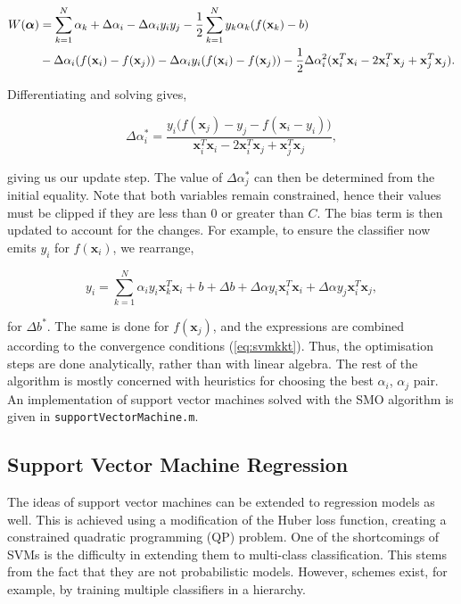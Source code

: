 \documentclass[11pt]{amsart}
\begin{document}
\begin{align}
W(\boldsymbol\alpha) &= \sum_{k=1}^N\alpha_k + \Delta\alpha_i -\Delta\alpha_iy_iy_j - \frac{1}{2}\sum_{k=1}^Ny_k\alpha_k(f(\mathbf{x}_k) - b) \notag \\ 
&- \Delta\alpha_i(f(\mathbf{x}_i) - f(\mathbf{x}_j)) - \Delta\alpha_iy_i(f(\mathbf{x}_i) - f(\mathbf{x}_j)) - \frac{1}{2}\Delta\alpha_i^2(\mathbf{x}_i^T\mathbf{x}_i - 2\mathbf{x}_i^T\mathbf{x}_j + \mathbf{x}_j^T\mathbf{x}_j). \notag 
\end{align}

Differentiating and solving gives,

$$\Delta\alpha_i^* = \frac{y_i\big(f(\mathbf{x}_j) - y_j - f(\mathbf{x}_i - y_i)\big)}{\mathbf{x}_i^T\mathbf{x}_i - 2\mathbf{x}_i^T\mathbf{x}_j + \mathbf{x}_j^T\mathbf{x}_j},$$

giving us our update step. The value of $\Delta\alpha_j^*$ can then be determined from the initial equality. Note that both variables remain constrained, hence their values must be clipped if they are less than $0$ or greater than $C$. The bias term is then updated to account for the changes. For example, to ensure the classifier now emits $y_i$ for $f(\mathbf{x}_i)$, we rearrange,

$$y_i = \sum_{k=1}^N \alpha_iy_i\mathbf{x}_k^T\mathbf{x}_i + b + \Delta b + \Delta\alpha y_i\mathbf{x}_i^T\mathbf{x}_i + \Delta\alpha y_j\mathbf{x}_i^T\mathbf{x}_j,$$

for $\Delta b^*$. The same is done for $f(\mathbf{x}_j)$, and the expressions are combined according to the convergence conditions (\ref{eq:svmkkt}). Thus, the optimisation steps are done analytically, rather than with linear algebra. The rest of the algorithm is mostly concerned with heuristics for choosing the best $\alpha_i$, $\alpha_j$ pair. An implementation of support vector machines solved with the SMO algorithm is given in \texttt{supportVectorMachine.m}.

\subsection{Support Vector Machine Regression}

The ideas of support vector machines can be extended to regression models as well. This is achieved using a modification of the Huber loss function, creating a constrained quadratic programming (QP) problem. One of the shortcomings of SVMs is the difficulty in extending them to multi-class classification. This stems from the fact that they are not probabilistic models. However, schemes exist, for example, by training multiple classifiers in a hierarchy.
\end{document}
